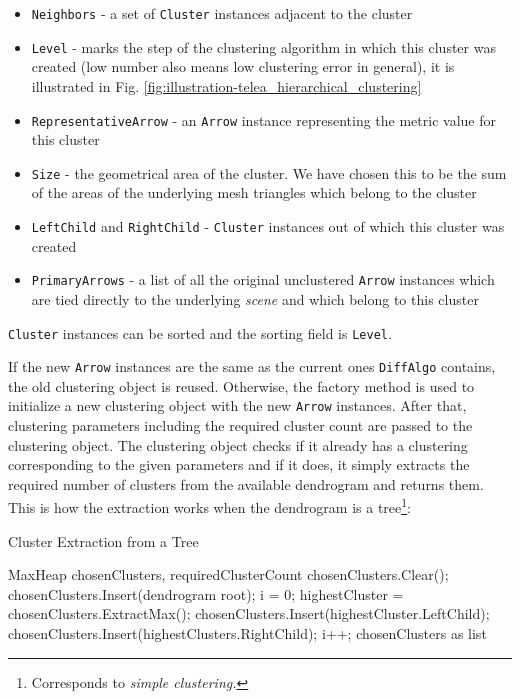 \begin{itemize}
\item \verb+Neighbors+ - a set of \verb+Cluster+ instances adjacent to the cluster
\item \verb+Level+ - marks the step of the clustering algorithm in which this cluster was created (low number also means low clustering error in general), it is illustrated in Fig. \ref{fig:illustration-telea_hierarchical_clustering}
\item \verb+RepresentativeArrow+ - an \verb+Arrow+ instance representing the metric value for this cluster
\item \verb+Size+ - the geometrical area of the cluster. We have chosen this to be the sum of the areas of the underlying mesh triangles which belong to the cluster
\item \verb+LeftChild+ and \verb+RightChild+ - \verb+Cluster+ instances out of which this cluster was created
\item \verb+PrimaryArrows+ - a list of all the original unclustered \verb+Arrow+ instances which are tied directly to the underlying {\it scene} and which belong to this cluster
\end{itemize}

\verb+Cluster+ instances can be sorted and the sorting field is \verb+Level+.

If the new \verb+Arrow+ instances are the same as the current ones \verb+DiffAlgo+ contains, the old clustering object is reused. Otherwise, the factory method is used to initialize a new clustering object with the new \verb+Arrow+ instances. After that, clustering parameters including the required cluster count are passed to the clustering object. The clustering object checks if it already has a clustering corresponding to the given parameters and if it does, it simply extracts the required number of clusters from the available dendrogram and returns them. This is how the extraction works when the dendrogram is a tree\footnote{Corresponds to {\it simple clustering.}}:

\begin{algorithm}[H]
\caption{Cluster Extraction from a Tree}
\label{algo:cluster_extract-tree}
\begin{algorithmic}[1]

\Require MaxHeap chosenClusters, requiredClusterCount
\Statex
\State chosenClusters.Clear();
\State chosenClusters.Insert(dendrogram root);
\State i = 0;
	\State highestCluster = chosenClusters.ExtractMax();
    \State chosenClusters.Insert(highestCluster.LeftChild);
    \State chosenClusters.Insert(highestClusters.RightChild);
    \State i++;
\EndWhile
\Statex
\Return chosenClusters as list
\end{algorithmic}
\end{algorithm}

